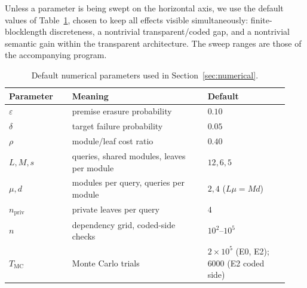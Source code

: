 \documentclass[journal]{IEEEtran}
\numberwithin{equation}{section}
\begin{document}
Unless a parameter is being swept on the horizontal axis, we use the default
values of Table~\ref{tab:numerical-defaults}, chosen to keep all effects
visible simultaneously: finite-blocklength discreteness, a nontrivial
transparent/coded gap, and a nontrivial semantic gain within the transparent
architecture.  The sweep ranges are those of the accompanying program.

\begin{table}[t]
\caption{Default numerical parameters used in Section~\ref{sec:numerical}.}
\label{tab:numerical-defaults}
\centering
\small
\setlength{\tabcolsep}{4pt}
\begin{tabularx}{\linewidth}{@{} >{\raggedright\arraybackslash}p{0.21\linewidth}
                                >{\raggedright\arraybackslash}p{0.45\linewidth}
                                >{\raggedright\arraybackslash}p{0.27\linewidth} @{}}
\toprule
Parameter & Meaning & Default \\ \midrule
\(\varepsilon\) & premise erasure probability & \(0.10\) \\
\(\delta\) & target failure probability & \(0.05\) \\
\(\rho\) & module/leaf cost ratio & \(0.40\) \\
\(L,M,s\) & queries, shared modules, leaves per module & \(12,6,5\) \\
\(\mu,d\) & modules per query, queries per module & \(2,4\) (\(L\mu=Md\)) \\
\(n_{\mathrm{priv}}\) & private leaves per query & \(4\) \\
\(n\) & dependency grid, coded-side checks & \(10^2\)--\(10^5\) \\
\(T_{\mathrm{MC}}\) & Monte Carlo trials & \(2\times10^5\) (E0, E2); \(6000\) (E2 coded side) \\
\bottomrule
\end{tabularx}
\end{table}
\end{document}
